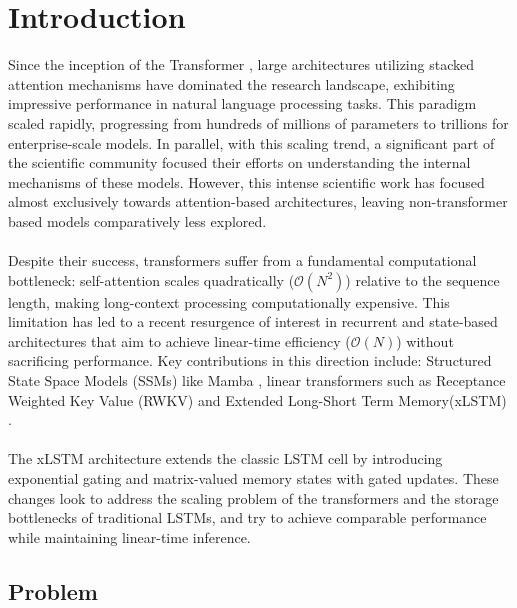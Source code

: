 \section{Introduction}
\label{ch:introduction}

Since the inception of the Transformer \cite{vaswani2017attention}, large architectures utilizing stacked 
attention mechanisms have dominated the research landscape, exhibiting impressive performance in 
natural language processing tasks. This paradigm scaled rapidly, progressing from hundreds
of millions of parameters to trillions for enterprise-scale models. In parallel, 
with this scaling trend, a significant part of the scientific community focused their efforts on understanding
the internal mechanisms of these models. However, this intense scientific work has focused
almost exclusively towards attention-based architectures, leaving non-transformer based models comparatively less explored. \\ \\
%
Despite their success, transformers suffer from a fundamental computational bottleneck:
self-attention scales quadratically ($\mathcal{O}(N^2)$) relative to the sequence length, making long-context
processing computationally expensive. This limitation has led to a recent resurgence of interest in recurrent and 
state-based architectures that aim to achieve linear-time efficiency ($\mathcal{O}(N)$) without sacrificing performance. 
Key contributions in this direction include: Structured State Space Models (SSMs) like Mamba \cite{gu2024mambalineartimesequencemodeling}, 
linear transformers such as Receptance Weighted Key Value (RWKV)\cite{peng2023rwkvreinventingrnnstransformer} and 
Extended Long-Short Term Memory(xLSTM) \cite{beck2024xlstmextendedlongshortterm}. \\ \\
%
The xLSTM architecture extends the classic LSTM cell \cite{10.5555/2998981.2999048} by 
introducing exponential gating and matrix-valued memory states with gated updates. These changes look to address the scaling 
problem of the transformers and the storage bottlenecks of traditional LSTMs, and try to achieve comparable performance while 
maintaining linear-time inference.  

\subsection{Problem}

